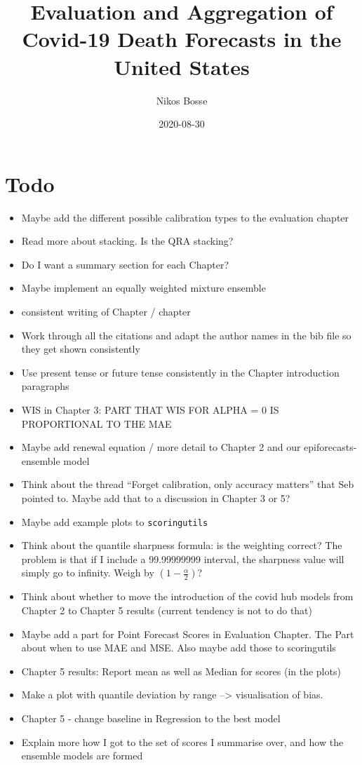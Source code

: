 \documentclass[
]{book}
\title{Evaluation and Aggregation of Covid-19 Death Forecasts in the United States}
\author{Nikos Bosse}
\date{2020-08-30}
\begin{document}
\maketitle

{
\setcounter{tocdepth}{2}
\tableofcontents
}
\hypertarget{todo}{%
\chapter{Todo}\label{todo}}

\begin{itemize}
\item
  Maybe add the different possible calibration types to the evaluation chapter
\item
  Read more about stacking. Is the QRA stacking?
\item
  Do I want a summary section for each Chapter?
\item
  Maybe implement an equally weighted mixture ensemble
\item
  consistent writing of Chapter / chapter
\item
  Work through all the citations and adapt the author names in the bib file so they get shown consistently
\item
  Use present tense or future tense consistently in the Chapter introduction paragraphs
\item
  WIS in Chapter 3: PART THAT WIS FOR ALPHA = 0 IS PROPORTIONAL TO THE MAE
\item
  Maybe add renewal equation / more detail to Chapter 2 and our epiforecasts-ensemble model
\item
  Think about the thread ``Forget calibration, only accuracy matters'' that Seb pointed to. Maybe add that to a discussion in Chapter 3 or 5?
\item
  Maybe add example plots to \texttt{scoringutils}
\item
  Think about the quantile sharpness formula: is the weighting correct? The problem is that if I include a 99.99999999 interval, the sharpness value will simply go to infinity. Weigh by \((1 - \frac{\alpha}{2})\)?
\item
  Think about whether to move the introduction of the covid hub models from Chapter 2 to Chapter 5 results (current tendency is not to do that)
\item
  Maybe add a part for Point Forecast Scores in Evaluation Chapter. The Part about when to use MAE and MSE. Also maybe add those to scoringutils
\item
  Chapter 5 results: Report mean as well as Median for scores (in the plots)
\item
  Make a plot with quantile deviation by range --\textgreater{} visualisation of bias.
\item
  Chapter 5 - change baseline in Regression to the best model
\item
  Explain more how I got to the set of scores I summarise over, and how the ensemble models are formed
\end{itemize}
\end{document}

